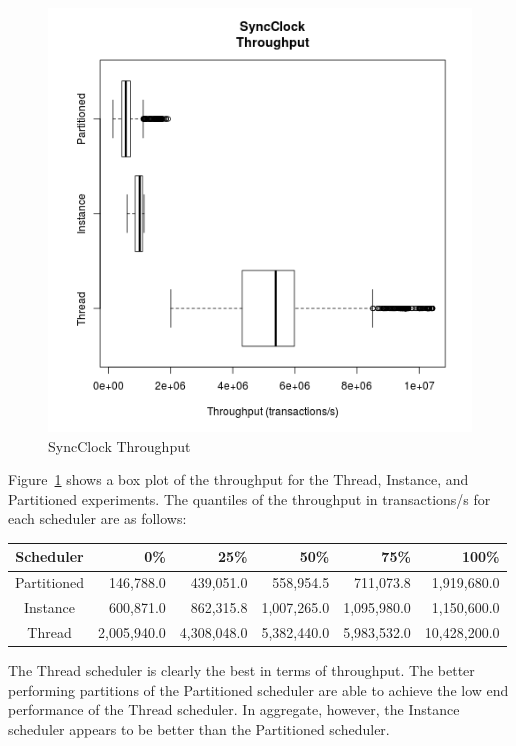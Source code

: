 \begin{figure}[H]
\center
\includegraphics[height=.4\textheight]{sync_throughput_box.png}
\caption{SyncClock Throughput}
\label{sync_throughput_box}
\end{figure}

Figure~\ref{sync_throughput_box} shows a box plot of the throughput for the Thread, Instance, and Partitioned experiments.
The quantiles of the throughput in transactions/s for each scheduler are as follows:
\begin{center}
\begin{tabular}{crrrrr}
Scheduler   &       0\%   &    25\%     &    50\%     &    75\%     &   100\% \\
\hline
Partitioned &   146,788.0 &   439,051.0 &   558,954.5 &   711,073.8 &  1,919,680.0 \\
Instance    &   600,871.0 &   862,315.8 & 1,007,265.0 & 1,095,980.0 &  1,150,600.0 \\
Thread      & 2,005,940.0 & 4,308,048.0 & 5,382,440.0 & 5,983,532.0 & 10,428,200.0 \\
\end{tabular}
\end{center}
The Thread scheduler is clearly the best in terms of throughput.
The better performing partitions of the Partitioned scheduler are able to achieve the low end performance of the Thread scheduler.
In aggregate, however, the Instance scheduler appears to be better than the Partitioned scheduler.

